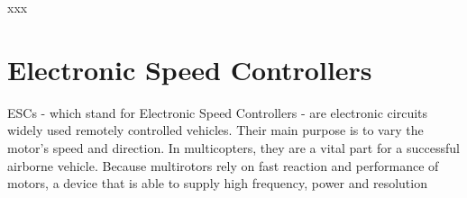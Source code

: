 xxx

\section{Electronic Speed Controllers}
ESCs - which stand for Electronic Speed Controllers - are electronic circuits widely used remotely controlled vehicles. Their main purpose is to vary the motor's speed and direction. %
\newline
In multicopters, they are a vital part for a successful airborne vehicle. Because multirotors rely on fast reaction and performance of motors, a device that is able to supply high frequency, power and resolution